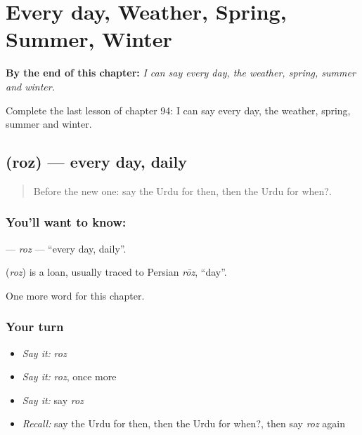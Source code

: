 
\chapter{Every day, Weather, Spring, Summer, Winter}
\label{ch:ur-every-day-weather-spring-summer-winter}

\begin{chapteropening}
\textbf{By the end of this chapter:} \emph{I can say every day, the weather, spring, summer and winter.}

Complete the last lesson of chapter 94: I can say every day, the weather, spring, summer and winter.
\end{chapteropening}

\section[\texorpdfstring{\ur{روز} (roz)}{روز (roz)}]{ (roz) — every day, daily}

\label{lesson:UR-C94-roz}



\begin{quote}
Before the new one: say the Urdu for then, then the Urdu for when?.
\end{quote}

\subsection*{You'll want to know: }
\textbf{} — \emph{roz} — \textquotedblleft{}every day, daily\textquotedblright{}.

\begin{cousinweb}
\textbf{} (\emph{roz}) is a loan, usually traced to Persian \emph{rōz}, \textquotedblleft{}day\textquotedblright{}.
\end{cousinweb}

\begin{grammarlens}[title={What you've built}]
One more word for this chapter.
\end{grammarlens}

\subsection*{Your turn}
\begin{itemize}
\raggedright
  \item \emph{Say it:} \emph{roz}
  \item \emph{Say it:} \emph{roz}, once more
  \item \emph{Say it:} say \emph{roz}
  \item \emph{Recall:} say the Urdu for then, then the Urdu for when?, then say \emph{roz} again
\end{itemize}

